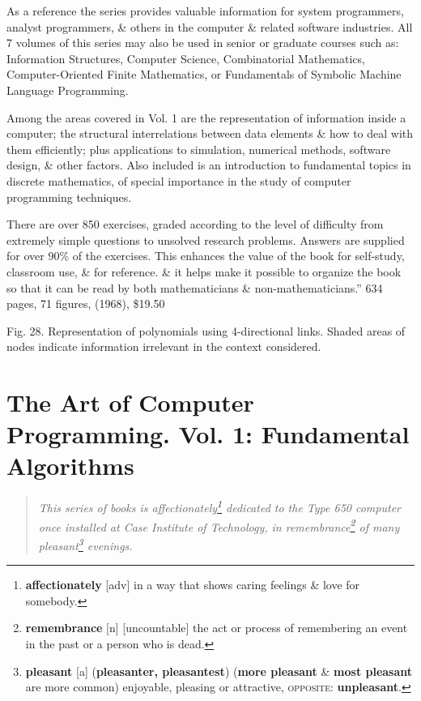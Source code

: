 \documentclass[oneside]{book}
\numberwithin{equation}{section}
\begin{document}
As a reference the series provides valuable information for system programmers, analyst programmers, \& others in the computer \& related software industries. All 7 volumes of this series may also be used in senior or graduate courses such as: Information Structures, Computer Science, Combinatorial Mathematics, Computer-Oriented Finite Mathematics, or Fundamentals of Symbolic Machine Language Programming.

Among the areas covered in Vol. 1 are the representation of information inside a computer; the structural interrelations between data elements \& how to deal with them efficiently; plus applications to simulation, numerical methods, software design, \& other factors. Also included is an introduction to fundamental topics in discrete mathematics, of special importance in the study of computer programming techniques.

There are over 850 exercises, graded according to the level of difficulty from extremely simple questions to unsolved research problems. Answers are supplied for over 90\% of the exercises. This enhances the value of the book for self-study, classroom use, \& for reference. \& it helps make it possible to organize the book so that it can be read by both mathematicians \& non-mathematicians.'' 634 pages, 71 figures, (1968), \$19.50

\textsf{Fig. 28. Representation of polynomials using 4-directional links. Shaded areas of nodes indicate information irrelevant in the context considered.}


\chapter{The Art of Computer Programming. Vol. 1: Fundamental Algorithms}

\begin{quotation}
	\textit{This series of books is affectionately\footnote{\textbf{affectionately} [adv] in a way that shows caring feelings \& love for somebody.} dedicated to the Type 650 computer once installed at Case Institute of Technology, in remembrance\footnote{\textbf{remembrance} [n] [uncountable] the act or process of remembering an event in the past or a person who is dead.} of many pleasant\footnote{\textbf{pleasant} [a] (\textbf{pleasanter, pleasantest}) (\textbf{more pleasant} \& \textbf{most pleasant} are more common) enjoyable, pleasing or attractive, \textsc{opposite}: \textbf{unpleasant}.} evenings.}
\end{quotation}
\end{document}
